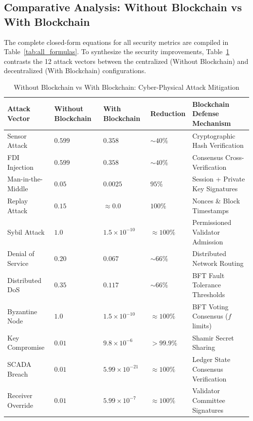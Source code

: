 \documentclass[10pt,twocolumn,journal]{IEEEtran}
\begin{document}
\subsection{Comparative Analysis: Without Blockchain vs With Blockchain}
\label{sec:comparative_analysis}

The complete closed-form equations for all security metrics are compiled in Table~\ref{tab:all_formulas}. To synthesize the security improvements, Table~\ref{tab:comparison} contrasts the 12 attack vectors between the centralized (Without Blockchain) and decentralized (With Blockchain) configurations.

\begin{table}[t]
\caption{Without Blockchain vs With Blockchain: Cyber-Physical Attack Mitigation}
\label{tab:comparison}
\centering
\small
\begin{tabular}{@{}lllll@{}}
\toprule
\textbf{Attack Vector} & \textbf{Without Blockchain} & \textbf{With Blockchain} & \textbf{Reduction} & \textbf{Blockchain Defense Mechanism} \\
\midrule
Sensor Attack & $0.599$ & $0.358$ & $\sim40\%$ & Cryptographic Hash Verification \\
FDI Injection & $0.599$ & $0.358$ & $\sim40\%$ & Consensus Cross-Verification \\
Man-in-the-Middle & $0.05$ & $0.0025$ & $95\%$ & Session + Private Key Signatures \\
Replay Attack & $0.15$ & $\approx 0.0$ & $100\%$ & Nonces \& Block Timestamps \\
Sybil Attack & $1.0$ & $1.5 \times 10^{-10}$ & $\approx 100\%$ & Permissioned Validator Admission \\
Denial of Service & $0.20$ & $0.067$ & $\sim66\%$ & Distributed Network Routing \\
Distributed DoS & $0.35$ & $0.117$ & $\sim66\%$ & BFT Fault Tolerance Thresholds \\
Byzantine Node & $1.0$ & $1.5 \times 10^{-10}$ & $\approx 100\%$ & BFT Voting Consensus ($f$ limits) \\
Key Compromise & $0.01$ & $9.8 \times 10^{-6}$ & $>99.9\%$ & Shamir Secret Sharing \\
SCADA Breach & $0.01$ & $5.99 \times 10^{-21}$ & $\approx 100\%$ & Ledger State Consensus Verification \\
Receiver Override & $0.01$ & $5.99 \times 10^{-7}$ & $\approx 100\%$ & Validator Committee Signatures \\
\bottomrule
\end{tabular}
\end{table}
\end{document}

